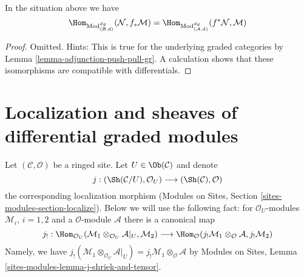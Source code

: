 \begin{lemma}
\label{lemma-adjunction-push-pull-dg}
In the situation above we have
$$
\Hom_{\text{Mod}_{(\mathcal{B}, \text{d})}^{dg}}(
\mathcal{N}, f_*\mathcal{M}) =
\Hom_{\text{Mod}_{(\mathcal{A}, \text{d})}^{dg}}(
f^*\mathcal{N}, \mathcal{M})
$$
\end{lemma}

\begin{proof}
Omitted. Hints: This is true for the underlying graded categories
by Lemma \ref{lemma-adjunction-push-pull-gr}. A calculation shows
that these isomorphisms are compatible with differentials.
\end{proof}















\section{Localization and sheaves of differential graded modules}
\label{section-localize-dg}

\noindent
Let $(\mathcal{C}, \mathcal{O})$ be a ringed site.
Let $U \in \Ob(\mathcal{C})$ and denote
$$
j :
(\Sh(\mathcal{C}/U), \mathcal{O}_U)
\longrightarrow
(\Sh(\mathcal{C}), \mathcal{O})
$$
the corresponding localization morphism
(Modules on Sites, Section \ref{sites-modules-section-localize}).
Below we will use the following fact: for $\mathcal{O}_U$-modules
$\mathcal{M}_i$, $i = 1, 2$ and a $\mathcal{O}$-module $\mathcal{A}$
there is a canonical map
$$
j_! :
\Hom_{\mathcal{O}_U}(
\mathcal{M}_1 \otimes_{\mathcal{O}_U} \mathcal{A}|_U, \mathcal{M}_2)
\longrightarrow
\Hom_\mathcal{O}(
j_!\mathcal{M}_1 \otimes_\mathcal{O} \mathcal{A}, j_!\mathcal{M}_2)
$$
Namely, we have
$j_!(\mathcal{M}_1 \otimes_{\mathcal{O}_U} \mathcal{A}|_U) =
j_!\mathcal{M}_1 \otimes_\mathcal{O} \mathcal{A}$ by
Modules on Sites, Lemma \ref{sites-modules-lemma-j-shriek-and-tensor}.

